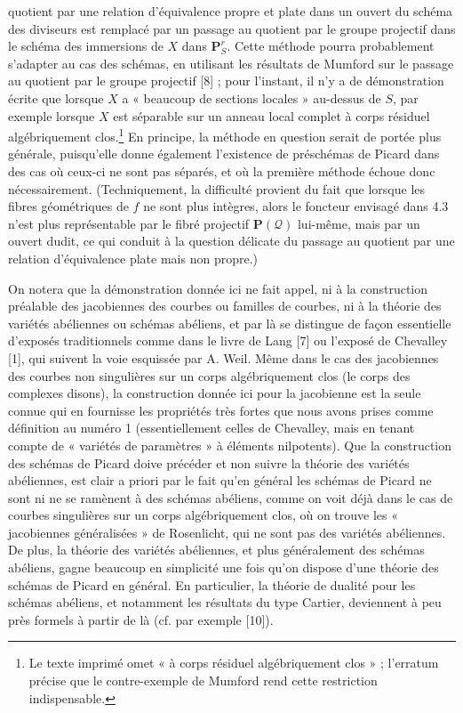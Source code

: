 quotient par une relation d'équivalence propre et plate dans un ouvert du
schéma des diviseurs est remplacé par un passage au quotient par le groupe
projectif dans le schéma des immersions de $X$ dans $\mathbf P^r_S$. Cette
méthode pourra probablement s'adapter au cas des schémas, en utilisant les
résultats de Mumford sur le passage au quotient par le groupe projectif [8] ;
pour l'instant, il n'y a de démonstration écrite que lorsque $X$ a « beaucoup
de sections locales » au-dessus de $S$, par exemple lorsque $X$ est séparable
sur un anneau local complet à corps résiduel algébriquement
clos.\footnote{Le texte imprimé omet « à corps résiduel algébriquement clos » ;
l'erratum précise que le contre-exemple de Mumford rend cette restriction
indispensable.} En principe, la méthode en question serait de
portée plus générale, puisqu'elle donne également l'existence de préschémas de
Picard dans des cas où ceux-ci ne sont pas séparés, et où la première méthode
échoue donc nécessairement. (Techniquement, la difficulté provient du fait que
lorsque les fibres géométriques de $f$ ne sont plus intègres, alors le foncteur
envisagé dans 4.3 n'est plus représentable par le fibré projectif
$\mathbf P(\mathcal Q)$ lui-même, mais par un ouvert dudit, ce qui conduit à la
question délicate du passage au quotient par une relation d'équivalence plate
mais non propre.)

 On notera que la démonstration donnée ici ne fait appel,
ni à la construction préalable des jacobiennes des courbes ou familles de
courbes, ni à la théorie des variétés abéliennes ou schémas abéliens, et par là
se distingue de façon essentielle d'exposés traditionnels comme dans le livre
de Lang [7] ou l'exposé de Chevalley [1], qui suivent la voie esquissée par
A. Weil. Même dans le cas des jacobiennes des courbes non singulières sur un
corps algébriquement clos (le corps des complexes disons), la construction
donnée ici pour la jacobienne est la seule connue qui en fournisse les
propriétés très fortes que nous avons prises comme définition au numéro 1
(essentiellement celles de Chevalley, mais en tenant compte de « variétés de
paramètres » à éléments nilpotents). Que la construction des schémas de Picard
doive précéder et non suivre la théorie des variétés abéliennes, est clair a
priori par le fait qu'en général les schémas de Picard ne sont ni ne se
ramènent à des schémas abéliens, comme on voit déjà dans le cas de courbes
singulières sur un corps algébriquement clos, où on trouve les « jacobiennes
généralisées » de Rosenlicht, qui ne sont pas des variétés abéliennes. De plus,
la théorie des variétés abéliennes, et plus généralement des schémas abéliens,
gagne beaucoup en simplicité une fois qu'on dispose d'une théorie des schémas
de Picard en général. En particulier, la théorie de dualité pour les schémas
abéliens, et notamment les résultats du type Cartier, deviennent à peu près
formels à partir de là (cf. par exemple [10]).

